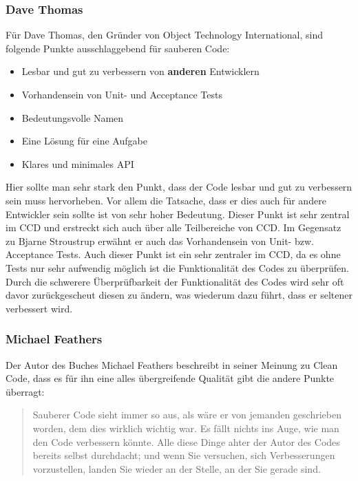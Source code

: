 \subsubsection{Dave Thomas}
Für Dave Thomas, den Gründer von Object Technology International,  sind folgende Punkte ausschlaggebend für sauberen Code:

\begin{itemize}
	\item Lesbar und gut zu verbessern von \textbf{anderen} Entwicklern
	\item Vorhandensein von Unit- und Acceptance Tests
	\item Bedeutungsvolle Namen
	\item Eine Lösung für eine Aufgabe
	\item Klares und minimales API
\end{itemize}

Hier sollte man sehr stark den Punkt, dass der Code lesbar und gut zu verbessern sein muss hervorheben. Vor allem die Tatsache, dass er dies auch für andere Entwickler sein sollte ist von sehr hoher Bedeutung. Dieser Punkt ist sehr zentral im CCD und erstreckt sich auch über alle Teilbereiche von CCD. Im Gegensatz zu Bjarne Stroustrup erwähnt er auch das Vorhandensein von Unit- bzw. Acceptance Tests. Auch dieser Punkt ist ein sehr zentraler im CCD, da es ohne Tests nur sehr aufwendig möglich ist die Funktionalität des Codes zu überprüfen. Durch die schwerere Überprüfbarkeit der Funktionalität des Codes wird sehr oft davor zurückgescheut diesen zu ändern, was wiederum dazu führt, dass er seltener verbessert wird.

\subsubsection{Michael Feathers}
Der Autor des Buches \cite{Feathers2013} Michael Feathers beschreibt in seiner Meinung zu Clean Code, dass es für ihn eine alles übergreifende Qualität gibt die andere Punkte überragt: 

\begin{quotation}
	Sauberer Code sieht immer so aus, als wäre er von jemanden geschrieben worden, dem dies wirklich wichtig war. Es fällt nichts ins Auge, wie man den Code verbessern könnte. Alle diese Dinge ahter der Autor des Codes bereits selbst durchdacht; und wenn Sie versuchen, sich Verbesserungen vorzustellen, landen Sie wieder an der Stelle, an der Sie gerade sind.
\end{quotation}

